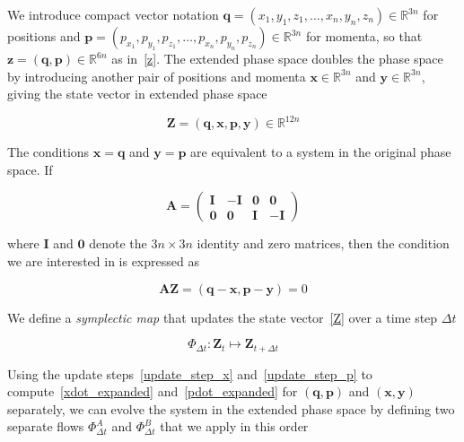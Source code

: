 \documentclass[12pt,a4paper]{article}
\theoremstyle{definition}
\theoremstyle{remark}
\begin{document}
We introduce compact vector notation $\mathbf{q} = (x_1, y_1, z_1, \ldots, x_n, y_n, z_n) \in \mathbb{R}^{3n}$ for positions and $\mathbf{p} = (p_{x_1}, p_{y_1}, p_{z_1}, \ldots, p_{x_n}, p_{y_n}, p_{z_n}) \in \mathbb{R}^{3n}$ for momenta, so that $\mathbf{z} = (\mathbf{q}, \mathbf{p}) \in \mathbb{R}^{6n}$ as in~\eqref{z}. The extended phase space doubles the phase space by introducing another pair of positions and momenta $\mathbf{x} \in \mathbb{R}^{3n}$ and $\mathbf{y} \in \mathbb{R}^{3n}$, giving the state vector in extended phase space

\begin{equation}\label{Z}
    \mathbf{Z} = (\mathbf{q}, \mathbf{x}, \mathbf{p}, \mathbf{y}) \in \mathbb{R}^{12n}
\end{equation}

The conditions $\mathbf{x} = \mathbf{q}$ and $\mathbf{y} = \mathbf{p}$ are equivalent to a system in the original phase space. If

\begin{equation}
    \mathbf{A} = \begin{pmatrix}
        \mathbf{I} & -\mathbf{I} & \mathbf{0} & \mathbf{0}  \\
        \mathbf{0} & \mathbf{0}  & \mathbf{I} & -\mathbf{I}
    \end{pmatrix}
\end{equation}

where $\mathbf{I}$ and $\mathbf{0}$ denote the $3n \times 3n$ identity and zero matrices, then the condition we are interested in is expressed as

\begin{equation}\label{AZ}
    \mathbf{A} \mathbf{Z} = (\mathbf{q} - \mathbf{x}, \mathbf{p} - \mathbf{y}) = 0
\end{equation}

We define a \textit{symplectic map} that updates the state vector~\eqref{Z} over a time step $\Delta t$

\begin{equation}\label{map}
    \Phi_{\Delta t}: \mathbf{Z}_t \mapsto \mathbf{Z}_{t+\Delta t}
\end{equation}

Using the update steps~\eqref{update_step_x} and~\eqref{update_step_p} to compute~\eqref{xdot_expanded} and~\eqref{pdot_expanded} for $(\mathbf{q}, \mathbf{p})$ and $(\mathbf{x}, \mathbf{y})$ separately, we can evolve the system in the extended phase space by defining two separate flows $\Phi^A_{\Delta t}$ and $\Phi^B_{\Delta t}$ that we apply in this order
\end{document}
